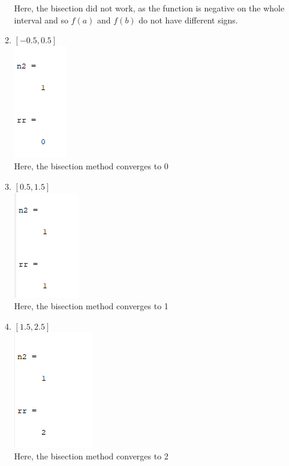 \documentclass[12pt,letterpaper]{article}
\begin{document}
\begin{enumerate}
\begin{enumerate}
        Here, the bisection did not work, as the function is negative on the whole
        interval and so $f(a)$ and $f(b)$ do not have different signs. 
        \item $\left [-0.5, 0.5 \right]$\\
        \includegraphics{2c.png}\\
        Here, the bisection method converges to 0
        \item $\left [0.5, 1.5 \right]$\\
        \includegraphics{2d.png}\\
        Here, the bisection method converges to 1
        \item $\left [1.5, 2.5 \right]$\\
        \includegraphics{2e.png}\\
        Here, the bisection method converges to 2
    \end{enumerate}
    

\end{enumerate}
\end{document}
